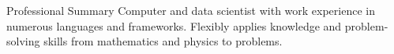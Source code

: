 \begin{rSection}{Professional Summary}
	Computer and data scientist with work experience in numerous languages and frameworks. Flexibly applies knowledge and problem-solving skills from mathematics and physics to problems.
\end{rSection}
